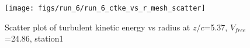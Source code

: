 \begin{figure}[H]
\centering
\texttt{[image: figs/run\_6/run\_6\_ctke\_vs\_r\_mesh\_scatter]}
\caption{Scatter plot of turbulent kinetic energy vs radius at $z/c$=5.37, $V_{free}$=24.86, station1}
\label{fig:run_6_ctke_vs_r_mesh_scatter}
\end{figure}


